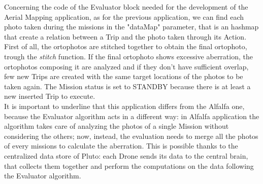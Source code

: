 Concerning the code of the Evaluator block needed for the development of the Aerial Mapping\cite{putti} application, as for the previous application, we can find each photo taken during the missions in the "dataMap" parameter, that is an hashmap that create a relation between a Trip and the photo taken through its Action.
First of all, the ortophotos are stitched together to obtain the final ortophoto, trough the \textit{stitch} function.
If the final ortophoto shows excessive aberration, the ortophotos composing it are analyzed and if they don't have sufficient overlap, few new Trips are created with the same target locations of the photos to be taken again. 
The Mission status is set to STANDBY because there is at least a new inserted Trip to execute.
\\

It is important to underline that this application differs from the Alfalfa\cite{alfalfa} one, because the Evaluator algorithm acts in a different way: 
in Alfalfa\cite{alfalfa} application the algorithm takes care of analyzing the photos of a single Mission without considering the others; now, instead, the evaluation needs to merge all the photos of every missions to calculate the aberration. 
This is possible thanks to the centralized data store of Pluto:
each Drone sends its data to the central brain, that collects them together and perform the computations on the data following the Evaluator algorithm.


